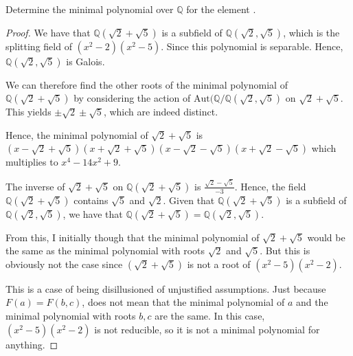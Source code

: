 \documentclass[10pt]{article}
\newcommand{\Q}{\mathbb{Q}}
\newenvironment{problem}[2][Problem]{\begin{trivlist}
		\item[\hskip \labelsep {\bfseries #1}\hskip \labelsep {\bfseries #2.}]}{\end{trivlist}}
\begin{document}
	\begin{problem}{2.1}
		Determine the minimal polynomial over $\Q$ for the element .
		\begin{proof}
			We have that $\Q(\sqrt{2}+\sqrt{5})$ is a subfield of $\Q(\sqrt{2}, \sqrt{5})$, which is the splitting field of $(x^2-2)(x^2-5)$. Since this polynomial is separable. Hence, $\Q(\sqrt{2}, \sqrt{5})$ is Galois.
			
			We can therefore find the other roots of the minimal polynomial of $\Q(\sqrt{2}+\sqrt{5})$ by considering the action of $\text{Aut}(\Q/\Q(\sqrt{2}, \sqrt{5})$ on $\sqrt{2}+\sqrt{5}$. This yields $\pm\sqrt{2} \pm\sqrt{5}$, which are indeed distinct. 
			
			Hence, the minimal polynomial of $\sqrt{2}+\sqrt{5}$ is $(x - \sqrt{2}+\sqrt{5})(x + \sqrt{2}+\sqrt{5})(x - \sqrt{2}-\sqrt{5})(x + \sqrt{2}-\sqrt{5})$ which multiplies to $x^4 - 14x^2 + 9$.
			
			
			\rem
				The inverse of $\sqrt{2}+\sqrt{5}$ on $\Q(\sqrt{2}+\sqrt{5})$ is $\frac{\sqrt{2}-\sqrt{5}}{-3}$. Hence, the field $\Q(\sqrt{2}+\sqrt{5})$ contains $\sqrt{5}$ and $\sqrt{2}$. Given that $\Q(\sqrt{2}+\sqrt{5})$ is a subfield of $\Q(\sqrt{2}, \sqrt{5})$, we have that $\Q(\sqrt{2} + \sqrt{5}) = \Q(\sqrt{2}, \sqrt{5})$.
			
				From this, I initially though that the minimal polynomial of $\sqrt{2}+\sqrt{5}$ would be the same as the minimal polynomial with roots $\sqrt{2}$ and $\sqrt{5}$. But this is obviously not the case since $(\sqrt{2}+\sqrt{5})$ is not a root of $(x^2 - 5)(x^2 - 2)$.
				
				This is a case of being disillusioned of unjustified assumptions. Just because $F(a) = F(b,c)$, does not mean that the minimal polynomial of $a$ and the minimal polynomial with roots $b,c$ are the same. In this case, $(x^2 - 5)(x^2 - 2)$ is not reducible, so it is not a minimal polynomial for anything.
		\end{proof}
	\end{problem}
	
\end{document}
